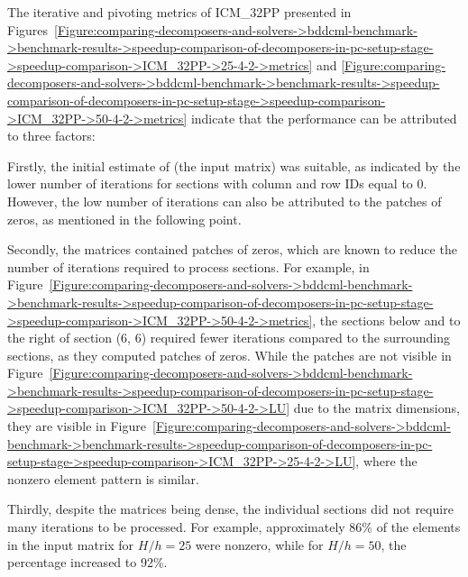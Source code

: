 The iterative and pivoting metrics of ICM\_32PP presented in Figures~\ref{Figure:comparing-decomposers-and-solvers->bddcml-benchmark->benchmark-results->speedup-comparison-of-decomposers-in-pc-setup-stage->speedup-comparison->ICM_32PP->25-4-2->metrics} and \ref{Figure:comparing-decomposers-and-solvers->bddcml-benchmark->benchmark-results->speedup-comparison-of-decomposers-in-pc-setup-stage->speedup-comparison->ICM_32PP->50-4-2->metrics} indicate that the performance can be attributed to three factors:
%
\begin{tight_enumerate}
	\item Firstly, the initial estimate of  (the input matrix) was suitable, as indicated by the lower number of iterations for sections with column and row IDs equal to 0.
However, the low number of iterations can also be attributed to the patches of zeros, as mentioned in the following point.
	\item Secondly, the matrices contained patches of zeros, which are known to reduce the number of iterations required to process sections.
For example, in Figure~\ref{Figure:comparing-decomposers-and-solvers->bddcml-benchmark->benchmark-results->speedup-comparison-of-decomposers-in-pc-setup-stage->speedup-comparison->ICM_32PP->50-4-2->metrics}, the sections below and to the right of section (6, 6) required fewer iterations compared to the surrounding sections, as they computed patches of zeros.
While the patches are not visible in Figure~\ref{Figure:comparing-decomposers-and-solvers->bddcml-benchmark->benchmark-results->speedup-comparison-of-decomposers-in-pc-setup-stage->speedup-comparison->ICM_32PP->50-4-2->LU} due to the matrix dimensions, they are visible in Figure~\ref{Figure:comparing-decomposers-and-solvers->bddcml-benchmark->benchmark-results->speedup-comparison-of-decomposers-in-pc-setup-stage->speedup-comparison->ICM_32PP->25-4-2->LU}, where the nonzero element pattern is similar.
	\item Thirdly, despite the matrices being dense, the individual sections did not require many iterations to be processed.
For example, approximately 86\% of the elements in the input matrix for $H/h = 25$ were nonzero, while for $H/h = 50$, the percentage increased to 92\%.
\end{tight_enumerate}

